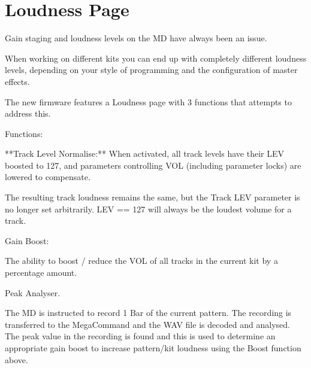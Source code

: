 \chapter{Loudness Page}
Gain staging and loudness levels on the MD have always been an issue.

When working on different kits you can end up with completely different loudness levels, depending on your style of programming and the configuration of master effects.

The new firmware features a Loudness page with 3 functions that attempts to address this.

Functions:

**Track Level Normalise:** When activated,  all track levels have their LEV boosted to 127, and parameters controlling VOL (including parameter locks) are lowered to compensate. 

The resulting track loudness remains the same, but the Track LEV parameter is no longer set arbitrarily. LEV == 127 will always be the loudest volume for a track.

Gain Boost:

The ability to boost / reduce the VOL of all tracks in the current kit by a percentage amount.

Peak Analyser.

The MD is instructed to record 1 Bar of the current pattern. The recording is transferred to the MegaCommand and the WAV file is decoded and analysed. The peak value in the recording is found and this is used to determine an appropriate gain boost to increase pattern/kit loudness using the Boost function above.